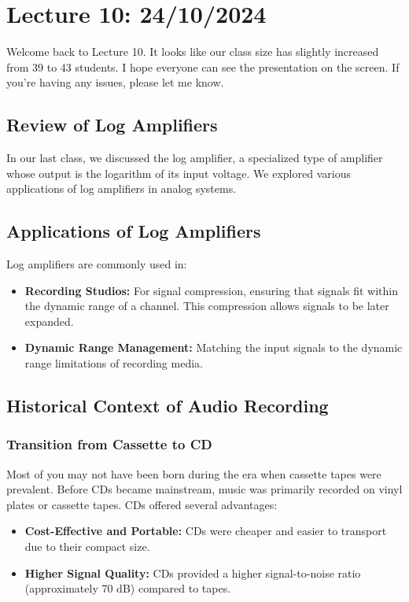 \documentclass[a4paper,9pt,twoside,openany,twocolumn]{memoir}
\begin{document}
\section*{Lecture 10: 24/10/2024}

Welcome back to Lecture 10. It looks like our class size has slightly increased from 39 to 43 students. I hope everyone can see the presentation on the screen. If you're having any issues, please let me know.

\subsection{Review of Log Amplifiers}

In our last class, we discussed the log amplifier, a specialized type of amplifier whose output is the logarithm of its input voltage. We explored various applications of log amplifiers in analog systems.

\subsection{Applications of Log Amplifiers}

Log amplifiers are commonly used in:

\begin{itemize}
    \item \textbf{Recording Studios:} For signal compression, ensuring that signals fit within the dynamic range of a channel. This compression allows signals to be later expanded.
    \item \textbf{Dynamic Range Management:} Matching the input signals to the dynamic range limitations of recording media.
\end{itemize}

\subsection{Historical Context of Audio Recording}

\subsubsection{Transition from Cassette to CD}

Most of you may not have been born during the era when cassette tapes were prevalent. Before CDs became mainstream, music was primarily recorded on vinyl plates or cassette tapes. CDs offered several advantages:

\begin{itemize}
    \item \textbf{Cost-Effective and Portable:} CDs were cheaper and easier to transport due to their compact size.
    \item \textbf{Higher Signal Quality:} CDs provided a higher signal-to-noise ratio (approximately 70 dB) compared to tapes.
\end{itemize}
\end{document}
